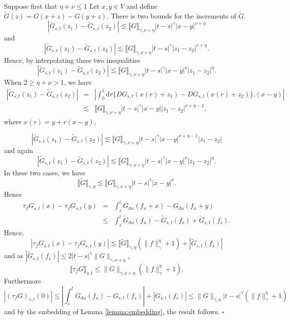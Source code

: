 \documentclass[a4paper,11pt]{article}
\newcommand{\mathd}{\mathrm{d}}
\newenvironment{proof}{{\sc Proof.}}{\hfill$\square$}
\begin{document}
\begin{proof}
  Suppose first that $\eta + \nu \leqslant 1$ Let $x,y \in V$ and define
  $\tilde{G} ( z ) =G ( x+z ) -G ( y+z )$. There is two bounds for the
  increments of $\tilde{G}$.
  \[ | \tilde{G}_{s,t} ( z_{1} ) - \tilde{G}_{s,t} ( z_{2} ) | \lesssim
     \llbracket G \rrbracket_{\gamma , \nu + \eta} | t-s |^{\gamma} | x-y
     |^{\nu + \eta} \]
  and
  \[ | \tilde{G}_{s,t} ( z_{1} ) - \tilde{G}_{s,t} ( z_{2} ) | \lesssim
     \llbracket G \rrbracket_{\gamma , \nu + \eta} | t-s |^{\gamma} | z_{1}
     -z_{2} |^{\nu + \eta} . \]
  Hence, by interpolating these two inequalities
  \[ | \tilde{G}_{s,t} ( z_{1} ) - \tilde{G}_{s,t} ( z_{2} ) | \lesssim
     \llbracket G \rrbracket_{\gamma , \nu + \eta} | t-s |^{\gamma} | x-y
     |^{\nu} | z_{1} -z_{2} |^{\eta} . \]
  When $2 \geqslant \eta + \nu >1$, we have
  \begin{eqnarray*}
    | \tilde{G}_{s,t} ( z_{1} ) - \tilde{G}_{s,t} ( z_{2} ) | & = & \left\lvert
    \int_{0}^{1} \mathd r  \{ D G_{s,t} ( x(r) +z_{1}  ) -D G_{s,t} ( x(r) +z_{2} ) \} .(x-y) \right\lvert\\
    & \lesssim & \llbracket G \rrbracket_{\gamma , \nu + \eta} | t-s
    |^{\gamma} | x-y | | z_{1} -z_{2} |^{\nu + \eta -1},
  \end{eqnarray*}
  where $x(r) = y+r(x-y)$,
  
  \[ | \tilde{G}_{s,t} ( z_{1} ) - \tilde{G}_{s,t} ( z_{2} ) | \lesssim
     \llbracket G \rrbracket_{\gamma , \nu + \eta} | t-s |^{\gamma} | x-y
     |^{\nu + \eta -1} | z_{1} -z_{2} | \]
  and again
  \[ | \tilde{G}_{s,t} ( z_{1} ) - \tilde{G}_{s,t} ( z_{2} ) | \lesssim
     \llbracket G \rrbracket_{\gamma , \nu + \eta} | t-s |^{\gamma} | x-y
     |^{\nu} | z_{1} -z_{2} |^{\eta} . \]
  In these two cases, we have
  \[ \llbracket \tilde{G} \rrbracket_{\gamma , \eta} \lesssim \llbracket G
     \rrbracket_{\gamma , \nu + \eta} | t-s |^{\gamma} | x-y |^{\nu} . \]
  Hence
  \begin{eqnarray*}
    \tau_{f} G_{s,t} ( x ) - \tau_{f} G_{s,t} ( y ) & = & \int_{s}^{t}
    G_{\mathd u} ( f_{u} +x ) -G_{\mathd u} ( f_{u} +y )\\
    & \leqslant & \int_{s}^{t} \tilde{G}_{\mathd u} ( f_{u} ) -
    \tilde{G}_{s,t} ( f_{s} ) + \tilde{G}_{s,t} ( f_{s} ).
  \end{eqnarray*}
  Hence,
  \[ | \tau_{f} G_{s,t} ( x ) - \tau_{f} G_{s,t} ( y ) | \lesssim \llbracket
     \tilde{G} \rrbracket_{\gamma , \eta} ( \| f \|^{\eta}_{\gamma} +1 ) + |
     \tilde{G}_{s,t} ( f_{s} ) | \]
  and as $| \tilde{G}_{s,t} ( f_{s} ) | \leqslant 2 | t-s |^{\gamma} \| G
  \|_{\gamma , \nu + \eta}$,
  \[ \llbracket \tau_{f} G \rrbracket_{s,t} \leqslant \| G \|_{\gamma , \nu +
     \eta} ( \| f \|^{\eta}_{\gamma} +1 ) . \]
  Furthermore
  \[ | ( \tau_{f} G )_{s,t} ( 0 ) | \leqslant \left\lvert \int_{s}^{t} G_{\mathd u}
     ( f_{u} ) -G_{s,t} ( f_{s} ) \right\lvert + | G_{s,t} ( f_{s} ) | \leqslant \|
     G \|_{\gamma , \eta} | t-s |^{\gamma} ( \| f \|_{\gamma}^{\eta} +1 ) \]
  and by the embedding of Lemma \ref{lemma:embedding}, the result follows.
\end{proof}
\end{document}
